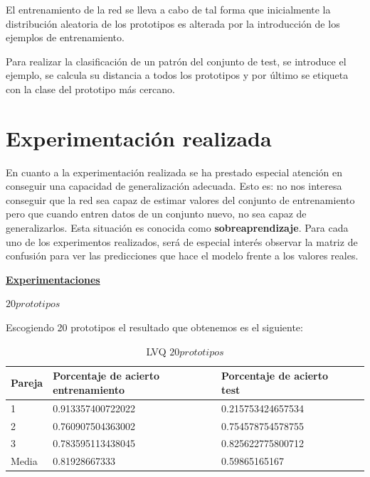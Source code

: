 \documentclass[11pt,spanish,listoffigures,listoftables]{workluis}
\begin{document}
\par El entrenamiento de la red se lleva a cabo de tal forma que inicialmente la distribución aleatoria de los prototipos es alterada por la introducción de los ejemplos de entrenamiento.

\par Para realizar la clasificación de un patrón del conjunto de test, se introduce el ejemplo, se calcula su distancia a todos los prototipos y por último se etiqueta con la clase del prototipo más cercano.

\section{Experimentación realizada}

\par En cuanto a la experimentación realizada se ha prestado especial atención en conseguir una capacidad de generalización adecuada. Esto es: no nos interesa conseguir que la red sea capaz de estimar valores del conjunto de entrenamiento pero que cuando entren datos de un conjunto nuevo, no sea capaz de generalizarlos. Esta situación es conocida como \textbf{sobreaprendizaje}. Para cada uno de los experimentos realizados, será de especial interés observar la matriz de confusión para ver las predicciones que hace el modelo frente a los valores reales.

\par \underline{\textbf{Experimentaciones}}


\par \textbf{$20 prototipos$}

\par Escogiendo 20 prototipos el resultado que obtenemos es el siguiente:

\begin{table}[H]
\centering
\caption{LVQ $20 prototipos$}
\label{tb:tb21}
\begin{tabular}{lllll}
\hline
\multicolumn{1}{|l|}{Pareja} & Porcentaje de acierto entrenamiento & Porcentaje de acierto test  \\ \hline \hline
1                            & 0.913357400722022    & 0.215753424657534 \\
2                            & 0.760907504363002    & 0.754578754578755 \\
3                            & 0.783595113438045    & 0.825622775800712 \\
Media                        & 0.81928667333        & 0.59865165167     \\ \hline
\end{tabular}
\end{table}
\end{document}
